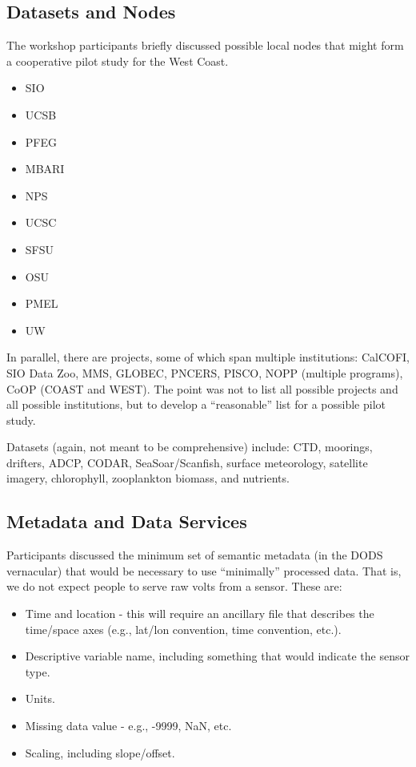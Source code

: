 \subsection{Datasets and Nodes}

The workshop participants briefly discussed possible local nodes that might form a 
cooperative pilot study for the West Coast.

\begin{itemize}
\item SIO
\item UCSB
\item PFEG
\item MBARI
\item NPS
\item UCSC
\item SFSU
\item OSU
\item PMEL
\item UW
\end{itemize}

In parallel, there are projects, some of which span multiple
institutions: CalCOFI, SIO Data Zoo, MMS, GLOBEC, PNCERS, PISCO, NOPP
(multiple programs), CoOP (COAST and WEST).  The point was not to list
all possible projects and all possible institutions, but to develop a
``reasonable'' list for a possible pilot study.

Datasets (again, not meant to be comprehensive) include: CTD,
moorings, drifters, ADCP, CODAR, SeaSoar/Scanfish, surface
meteorology, satellite imagery, chlorophyll, zooplankton biomass, and
nutrients.

\subsection{Metadata and Data Services}

Participants discussed the minimum set of semantic metadata (in the
DODS vernacular) that would be necessary to use ``minimally''
processed data. That is, we do not expect people to serve raw volts
from a sensor. These are:

\begin{itemize}
\item Time and location - this will require an ancillary file that
  describes the time/space axes (e.g., lat/lon convention, time
  convention, etc.).
\item Descriptive variable name, including something that would
  indicate the sensor type.
\item Units.
\item Missing data value - e.g., -9999, NaN, etc.
\item Scaling, including slope/offset.
\end{itemize}

